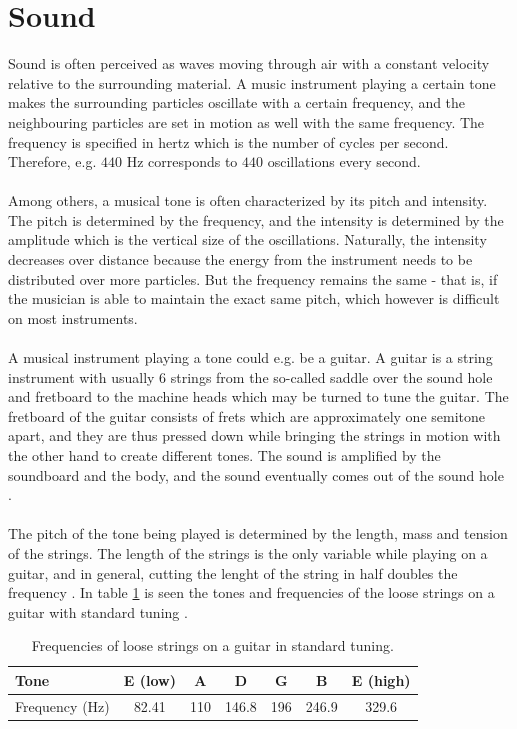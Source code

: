 \section{Sound}
Sound is often perceived as waves moving through air with a constant velocity relative to the surrounding material. A music instrument playing a certain tone makes the surrounding particles oscillate with a certain frequency, and the neighbouring particles are set in motion as well with the same frequency. The frequency is specified in hertz which is the number of cycles per second. Therefore, e.g. $440$ Hz corresponds to $440$ oscillations every second.
\\ \\
Among others, a musical tone is often characterized by its pitch and intensity. The pitch is determined by the frequency, and the intensity is determined by the amplitude which is the vertical size of the oscillations. Naturally, the intensity decreases over distance because the energy from the instrument needs to be distributed over more particles. But the frequency remains the same - that is, if the musician is able to maintain the exact same pitch, which however is difficult on most instruments.
\\ \\
A musical instrument playing a tone could e.g. be a guitar. A guitar is a string instrument with usually 6 strings from the so-called saddle over the sound hole and fretboard to the machine heads which may be turned to tune the guitar. The fretboard of the guitar consists of frets which are approximately one semitone apart, and they are thus pressed down while bringing the strings in motion with the other hand to create different tones. The sound is amplified by the soundboard and the body, and the sound eventually comes out of the sound hole \cite{WikiGuitar}.
\\ \\
The pitch of the tone being played is determined by the length, mass and tension of the strings. The length of the strings is the only variable while playing on a guitar, and in general, cutting the lenght of the string in half doubles the frequency \cite{AcousticGuitar}. In table \ref{fig:guitar_frequencies} is seen the tones and frequencies of the loose strings on a guitar with standard tuning \cite{guitar_strings}.
\begin{table}[H]
\centering
\begin{tabular}{l|cccccc}
Tone			& E	(low)	& A		& D		& G		& B		& E (high)\\ \hline
Frequency (Hz)	& 82.41		& 110	& 146.8	& 196	& 246.9	& 329.6
\end{tabular}
\caption{Frequencies of loose strings on a guitar in standard tuning.}
\label{fig:guitar_frequencies}
\end{table}
